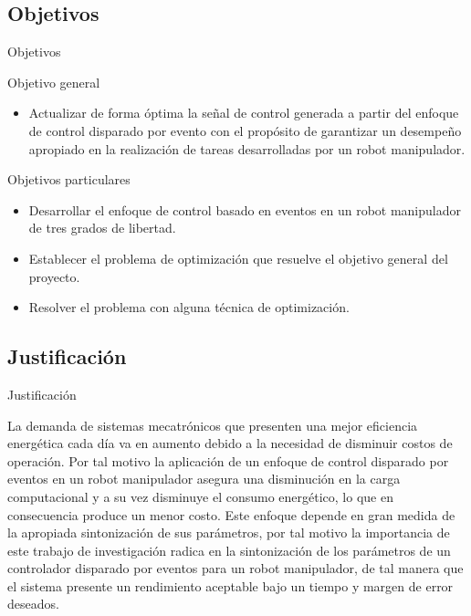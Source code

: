 \subsection{Objetivos}
\begin{frame}[shrink=20]{Objetivos}
\begin{block}{Objetivo general}
	\begin{itemize}
		\justifying
		\item Actualizar de forma óptima la señal de control generada a partir del enfoque de control disparado por evento con el propósito de garantizar un desempeño apropiado en la realización de tareas desarrolladas por un robot manipulador.
	\end{itemize}
\end{block}
\begin{block}{Objetivos particulares}
	\justifying
	\begin{itemize}
		\item Desarrollar el enfoque de control basado en eventos en un robot manipulador de tres grados de libertad.
		\item Establecer el problema de optimización que resuelve el objetivo general del proyecto.
		\item Resolver el problema con alguna técnica de optimización.
	\end{itemize}
\end{block}
\end{frame}

\subsection{Justificación}
\begin{frame}[shrink=20]{Justificación}
\begin{block}{}
	\justifying
	La demanda de sistemas mecatrónicos que presenten una mejor eficiencia energética cada día va en aumento debido a la necesidad de disminuir costos de operación. Por tal motivo la aplicación de un enfoque de control disparado por eventos en un robot manipulador asegura una disminución en la carga computacional y a su vez disminuye el consumo energético, lo que en consecuencia produce un menor costo. Este enfoque depende en gran medida de la apropiada sintonización de sus parámetros, por tal motivo la importancia de este trabajo de investigación radica en la sintonización de los parámetros de un controlador disparado por eventos para un robot manipulador, de tal manera que el sistema presente un rendimiento aceptable bajo un tiempo y margen de error deseados.
\end{block} 
\end{frame}

